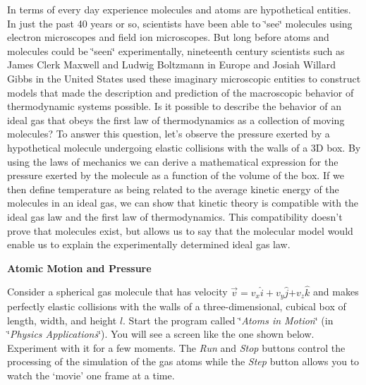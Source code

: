 In terms of every day experience molecules and atoms are hypothetical
entities. In just the past 40 years or so, scientists have been able
to \char`\"{}see\char`\"{} molecules using electron microscopes and
field ion microscopes. But long before atoms and molecules could be
\char`\"{}seen\char`\"{} experimentally, nineteenth century scientists
such as James Clerk Maxwell and Ludwig Boltzmann in Europe and Josiah
Willard Gibbs in the United States used these imaginary microscopic
entities to construct models that made the description and prediction
of the macroscopic behavior of thermodynamic systems possible. Is
it possible to describe the behavior of an ideal gas that obeys the
first law of thermodynamics as a collection of moving molecules? To
answer this question, let's observe the pressure exerted by a hypothetical
molecule undergoing elastic collisions with the walls of a 3D box.
By using the laws of mechanics we can derive a mathematical expression
for the pressure exerted by the molecule as a function of the volume
of the box. If we then define temperature as being related to the
average kinetic energy of the molecules in an ideal gas, we can show
that kinetic theory is compatible with the ideal gas law and the first
law of thermodynamics. This compatibility doesn't prove that molecules
exist, but allows us to say that the molecular model would enable
us to explain the experimentally determined ideal gas law.

\textbf{Atomic Motion and Pressure}

Consider a spherical gas molecule that has velocity 
\( \overrightarrow{v}=v_{x} \)\( \hat{i}+v_{y} \)\( \hat{j} \)\( + v_z\hat k\) and
makes perfectly elastic collisions with the walls of a three-dimensional, cubical
box of length, width, and height $l$. Start the program called \char`\"{}\textit{Atoms
in Motion}\char`\"{} (in \char`\"{}\textit{Physics Applications}\char`\"{}). You will see a screen
like the one shown below. Experiment with it for a few moments. 
The {\it Run} and {\it Stop} buttons control the processing of the 
simulation of the gas atoms while the {\it Step} button allows you to watch the
`movie' one frame at a time.

